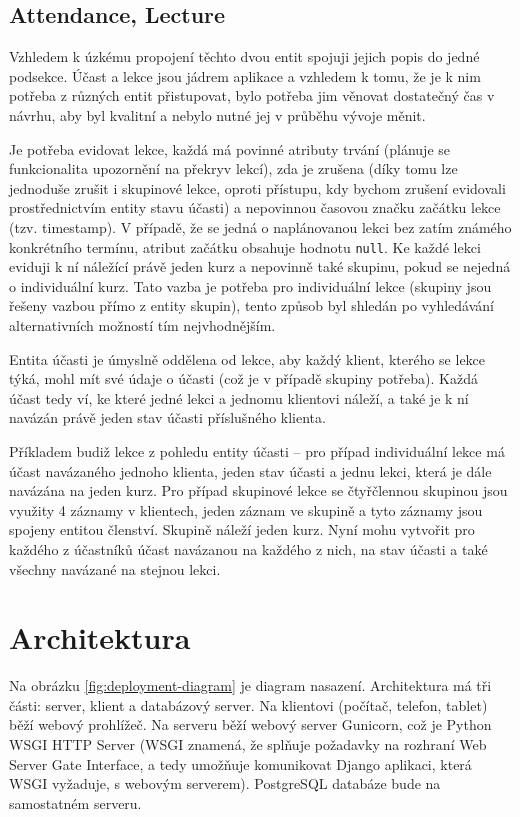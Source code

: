         \subsection{Attendance, Lecture}
        Vzhledem k úzkému propojení těchto dvou entit spojuji jejich popis do jedné podsekce. Účast a lekce jsou jádrem aplikace a vzhledem k tomu, že je k nim potřeba z různých entit přistupovat, bylo potřeba jim věnovat dostatečný čas v návrhu, aby byl kvalitní a nebylo nutné jej v průběhu vývoje měnit.
        
        Je potřeba evidovat lekce, každá má povinné atributy trvání (plánuje se funkcionalita upozornění na překryv lekcí), zda je zrušena (díky tomu lze jednoduše zrušit i skupinové lekce, oproti přístupu, kdy bychom zrušení evidovali prostřednictvím entity stavu účasti) a nepovinnou časovou značku začátku lekce (tzv. timestamp). V případě, že se jedná o naplánovanou lekci bez zatím známého konkrétního termínu, atribut začátku obsahuje hodnotu \verb|null|. Ke každé lekci eviduji k ní náležící právě jeden kurz a nepovinně také skupinu, pokud se nejedná o individuální kurz. Tato vazba je potřeba pro individuální lekce (skupiny jsou řešeny vazbou přímo z entity skupin), tento způsob byl shledán po vyhledávání alternativních možností tím nejvhodnějším.
        
        Entita účasti je úmyslně oddělena od lekce, aby každý klient, kterého se lekce týká, mohl mít své údaje o účasti (což je v případě skupiny potřeba). Každá účast tedy ví, ke které jedné lekci a jednomu klientovi náleží, a také je k ní navázán právě jeden stav účasti příslušného klienta.
        
        Příkladem budiž lekce z pohledu entity účasti -- pro případ individuální lekce má účast navázaného jednoho klienta, jeden stav účasti a jednu lekci, která je dále navázána na jeden kurz. Pro případ skupinové lekce se čtyřčlennou skupinou jsou využity 4 záznamy v klientech, jeden záznam ve skupině a tyto záznamy jsou spojeny entitou členství. Skupině náleží jeden kurz. Nyní mohu vytvořit pro každého z účastníků účast navázanou na každého z nich, na stav účasti a také všechny navázané na stejnou lekci.
        

    \section{Architektura}\label{architektura}
    Na obrázku \ref{fig:deployment-diagram} je diagram nasazení. Architektura má tři části: server, klient a databázový server. Na klientovi (počítač, telefon, tablet) běží webový prohlížeč. Na serveru běží webový server Gunicorn, což je Python WSGI HTTP Server (WSGI znamená, že splňuje požadavky na rozhraní Web Server Gate Interface, a tedy umožňuje komunikovat Django aplikaci, která WSGI vyžaduje, s webovým serverem). PostgreSQL databáze bude na samostatném serveru.
    
